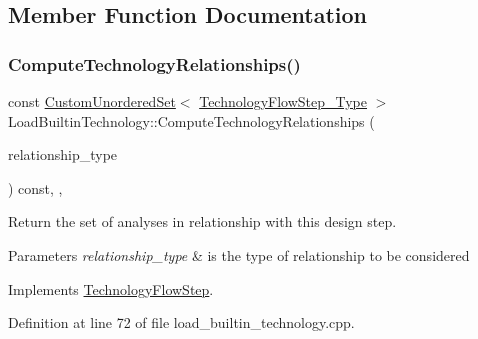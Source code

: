 \subsection{Member Function Documentation}
\mbox{\label{classLoadBuiltinTechnology_af45215c91a262842995c29fb1e79c8c9}} 
\subsubsection{\texorpdfstring{Compute\+Technology\+Relationships()}{ComputeTechnologyRelationships()}}
{\footnotesize\ttfamily const \hyperlink{classCustomUnorderedSet}{Custom\+Unordered\+Set}$<$ \hyperlink{technology__flow__step_8hpp_a65208cfec963a7d7def292f9db428292}{Technology\+Flow\+Step\+\_\+\+Type} $>$ Load\+Builtin\+Technology\+::\+Compute\+Technology\+Relationships (\begin{DoxyParamCaption}\item[{const \hyperlink{classDesignFlowStep_a723a3baf19ff2ceb77bc13e099d0b1b7}{Design\+Flow\+Step\+::\+Relationship\+Type}}]{relationship\+\_\+type }\end{DoxyParamCaption}) const\hspace{0.3cm}{\ttfamily [override]}, {\ttfamily [protected]}, {\ttfamily [virtual]}}



Return the set of analyses in relationship with this design step. 


\begin{DoxyParams}{Parameters}
{\em relationship\+\_\+type} & is the type of relationship to be considered \\
\hline
\end{DoxyParams}


Implements \hyperlink{classTechnologyFlowStep_ab543169c9b0143c8ae8831d765519075}{Technology\+Flow\+Step}.



Definition at line 72 of file load\+\_\+builtin\+\_\+technology.\+cpp.

\mbox{\label{classLoadBuiltinTechnology_ab0fb4115da509336a908c1ea53e0140c}} 
